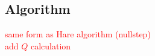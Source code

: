 















 

\subsection{Algorithm}

\textcolor{red}{same form as Hare algorithm (nullstep)\\
add \(Q\) calculation}

